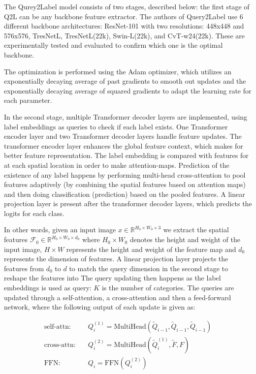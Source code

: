 \documentclass[lettersize,journal]{IEEEtran}
\begin{document}
The Qurey2Label model consists of two stages, described below: the first stage of Q2L can be any backbone feature extractor. The authors of Query2Label use 6 different backbone architectures: ResNet-101 with two resolutions: 448x448 and 576x576, TresNetL, TresNetL(22k), Swin-L(22k), and CvT-w24(22k). These are experimentally tested and evaluated to confirm which one is the optimal backbone. 

The optimization is performed using the Adam optimizer, which utilizes an exponentially decaying average of past gradients to smooth out updates and the exponentially decaying average of squared gradients to adapt the learning rate for each parameter. 

In the second stage, multiple Transformer decoder layers are implemented, using label embeddings as queries to check if each label exists. One Transformer encoder layer and two Transformer decoder layers handle feature updates. The transformer encoder layer enhances the global feature context, which makes for better feature representation. The label embedding is compared with features for at each spatial location in order to make attention-maps. Prediction of the existence of any label happens by performing multi-head cross-attention to pool features adaptively (by combining the spatial features based on attention maps) and then doing classification (prediction) based on the pooled features. A linear projection layer is present after the transformer decoder layers, which predicts the logits for each class. 

In other words, given an input image $x\in \mathbb{R}^{H_0\times W_0\times 3}$ we extract the spatial features $\mathcal{F}_0\in \mathbb{R}^{H_0\times W_0\times d_0}$ where $H_0 \times W_0$ denotes the height and weight of the input image, $H \times W$ represents the height and weight of the feature map and $d_0$ represents the dimension of features. A linear projection layer projects the features from $d_0$ to $d$ to match the query dimension in the second stage to reshape the features into 
The query updating then happens as the label embeddings is used as query: 
$K$ is the number of categories. The queries are updated through a self-attention, a cross-attention and then a feed-forward network, where the following output of each update is given as:

\begin{equation}
    \begin{aligned}
    \text{self-attn:} \quad & Q^{(1)}_i = \text{MultiHead}(\tilde{Q}_{i-1}, \tilde{Q}_{i-1}, \tilde{Q}_{i-1}) \\
    \text{cross-attn:} \quad & Q^{(2)}_i = \text{MultiHead}(\tilde{Q}^{(1)}_i, \tilde{F}, F) \\
    \text{FFN:} \quad & Q_i = \text{FFN}(Q^{(2)}_i)
    \end{aligned}
\end{equation}
\end{document}
